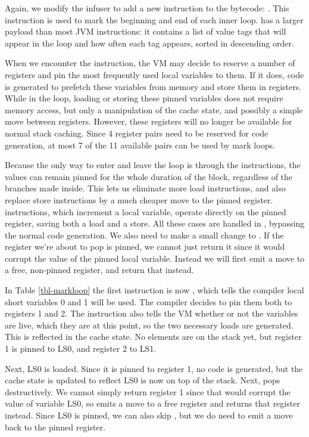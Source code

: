 Again, we modify the infuser to add a new instruction to the bytecode: . This instruction is used to mark the beginning and end of each inner loop.  has a larger payload than most JVM instructions: it contains a list of value tags that will appear in the loop and how often each tag appears, sorted in descending order.

When we encounter the  instruction, the VM may decide to reserve a number of registers and pin the most frequently used local variables to them. If it does, code is generated to prefetch these variables from memory and store them in registers. While in the loop, loading or storing these pinned variables does not require memory access, but only a manipulation of the cache state, and possibly a simple move between registers. However, these registers will no longer be available for normal stack caching. Since 4 register pairs need to be reserved for code generation, at most 7 of the 11 available pairs can be used by mark loops.

Because the only way to enter and leave the loop is through the  instructions, the values can remain pinned for the whole duration of the block, regardless of the branches made inside. This lets us eliminate more load instructions, and also replace store instructions by a much cheaper move to the pinned register.  instructions, which increment a local variable, operate directly on the pinned register, saving both a load and a store. All these cases are handled in , bypassing the normal code generation. We also need to make a small change to . If the register we're about to pop is pinned, we cannot just return it since it would corrupt the value of the pinned local variable. Instead we will first emit a move to a free, non-pinned register, and return that instead.

In Table \ref{tbl-markloop} the first instruction is now , which tells the compiler local short variables 0 and 1 will be used. The compiler decides to pin them both to registers 1 and 2. The  instruction also tells the VM whether or not the variables are live, which they are at this point, so the two necessary loads are generated. This is reflected in the cache state. No elements are on the stack yet, but register 1 is pinned to LS0, and register 2 to LS1.

Next, LS0 is loaded. Since it is pinned to register 1, no code is generated, but the cache state is updated to reflect LS0 is now on top of the stack. Next,  pops destructively. We cannot simply return register 1 since that would corrupt the value of variable LS0, so  emits a move to a free register and returns that register instead. Since LS0 is pinned, we can also skip , but we do need to emit a move back to the pinned register.


